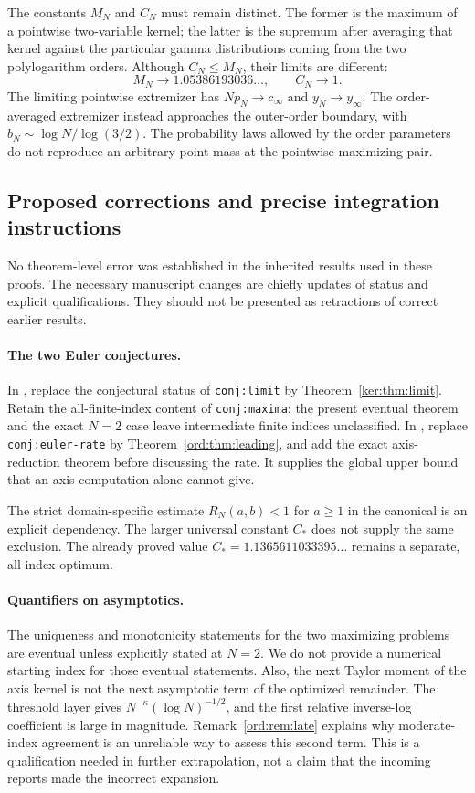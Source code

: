 The constants $M_N$ and $C_N$ must remain distinct. The former is the
maximum of a pointwise two-variable kernel; the latter is the supremum
after averaging that kernel against the particular gamma distributions
coming from the two polylogarithm orders. Although $C_N\le M_N$, their
limits are different:
\[
 M_N\longrightarrow1.05386193036\ldots,\qquad C_N\longrightarrow1.
\]
The limiting pointwise extremizer has $Np_N\to c_\infty$ and
$y_N\to y_\infty$. The order-averaged extremizer instead approaches
the outer-order boundary, with $b_N\sim\log N/\log(3/2)$. The probability
laws allowed by the order parameters do not reproduce an arbitrary
point mass at the pointwise maximizing pair.

\subsection{Proposed corrections and precise integration instructions}

No theorem-level error was established in the inherited results used
in these proofs. The necessary manuscript changes are chiefly updates
of status and explicit qualifications. They should not be presented
as retractions of correct earlier results.

\paragraph{The two Euler conjectures.}
In \cite{IncomingSharp}, replace the conjectural status of
\texttt{conj:limit} by Theorem~\ref{ker:thm:limit}. Retain the
all-finite-index content of \texttt{conj:maxima}: the present eventual
theorem and the exact $N=2$ case leave intermediate finite indices
unclassified. In \cite{IncomingBounds}, replace
\texttt{conj:euler-rate} by Theorem~\ref{ord:thm:leading}, and add
the exact axis-reduction theorem before discussing the rate.
It supplies the global upper bound that an axis computation alone
cannot give.

The strict domain-specific estimate $R_N(a,b)<1$ for $a\ge1$ in the
canonical  is an explicit dependency.
The larger universal constant $C_*$ does not supply the same
exclusion. The already proved value
$C_*=1.1365611033395\ldots$ remains a separate, all-index optimum.

\paragraph{Quantifiers on asymptotics.}
The uniqueness and monotonicity statements for the two maximizing
problems are eventual unless explicitly stated at $N=2$.
We do not provide a numerical starting index for those eventual
statements. Also, the next Taylor moment of the axis kernel is not
the next asymptotic term of the optimized remainder.
The threshold layer gives
$N^{-\kappa}(\log N)^{-1/2}$, and the first relative inverse-log
coefficient is large in magnitude. Remark~\ref{ord:rem:late} explains
why moderate-index agreement is an unreliable way to assess this
second term. This is a qualification needed in further extrapolation,
not a claim that the incoming reports made the incorrect expansion.

